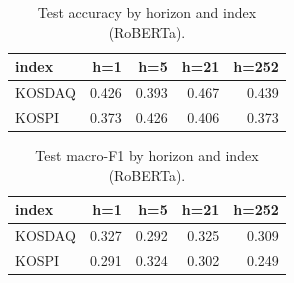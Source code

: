 \begin{table}[t]\centering
\caption{Test accuracy by horizon and index (RoBERTa).}
\begin{tabular}{lrrrr}
\toprule
index & h=1 & h=5 & h=21 & h=252 \\
\midrule
KOSDAQ & 0.426 & 0.393 & 0.467 & 0.439 \\
KOSPI & 0.373 & 0.426 & 0.406 & 0.373 \\
\bottomrule
\end{tabular}
\end{table}

\begin{table}[t]\centering
\caption{Test macro-F1 by horizon and index (RoBERTa).}
\begin{tabular}{lrrrr}
\toprule
index & h=1 & h=5 & h=21 & h=252 \\
\midrule
KOSDAQ & 0.327 & 0.292 & 0.325 & 0.309 \\
KOSPI & 0.291 & 0.324 & 0.302 & 0.249 \\
\bottomrule
\end{tabular}
\end{table}